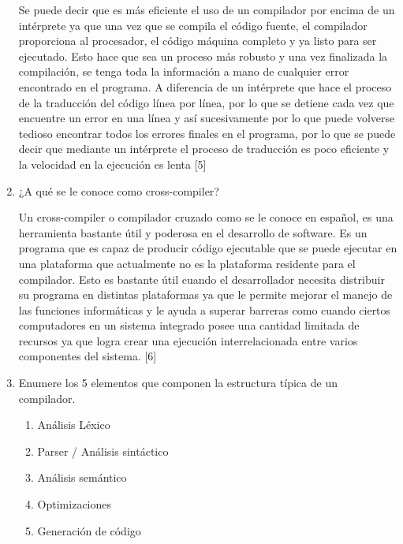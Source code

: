 \documentclass[12pt,a4paper]{article}
\begin{document}
\begin{enumerate}
    Se puede decir que es más eficiente el uso de un compilador por encima de un intérprete ya que una vez que se compila el código fuente, el compilador proporciona al procesador, el código máquina completo y ya listo para ser ejecutado. Esto hace que sea un proceso más robusto y una vez finalizada la compilación, se tenga toda la información a mano de cualquier error encontrado en el programa. A diferencia de un intérprete que hace el proceso de la traducción del código línea por línea, por lo que se detiene cada vez que encuentre un error en una línea y así sucesivamente por lo que puede volverse tedioso encontrar todos los errores finales en el programa, por lo que se puede decir que mediante un intérprete el proceso de traducción es poco eficiente y la velocidad en la ejecución es lenta [5]
    
    \item ¿A qué se le conoce como cross-compiler?
    
    Un cross-compiler o compilador cruzado como se le conoce en español, es una herramienta bastante útil y poderosa en el desarrollo de software. Es un programa que es capaz de producir código ejecutable que se puede ejecutar en una plataforma que actualmente no es la plataforma residente para el compilador. Esto es bastante útil cuando el desarrollador necesita distribuir su programa en distintas plataformas ya que le permite mejorar el manejo de las funciones informáticas y le ayuda a superar barreras como cuando ciertos computadores en un sistema integrado posee una cantidad limitada de recursos ya que logra crear una ejecución interrelacionada entre varios componentes del sistema. [6]
    
    \item Enumere los 5 elementos que componen la estructura típica de un compilador.
    
    \begin{enumerate}
    
    \item Análisis Léxico 
    
    \item Parser / Análisis sintáctico 
    
    \item Análisis semántico 
    
    \item Optimizaciones
    
    \item Generación de código
    
    \end{enumerate}


\end{enumerate}
\end{document}
